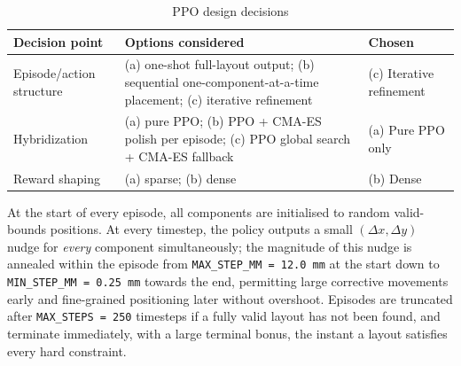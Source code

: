 \documentclass[11pt,a4paper,oneside]{report}
\begin{document}
\begin{table}[H]
\centering
\caption{PPO design decisions}
\label{tab:ppo_design}
\begin{tabular}{|p{3.8cm}|p{5.0cm}|p{3.9cm}|}
\hline
\textbf{Decision point} & \textbf{Options considered} & \textbf{Chosen} \\
\hline
Episode/action structure & (a) one-shot full-layout output; (b) sequential one-component-at-a-time placement; (c) iterative refinement & (c) Iterative refinement \\ \hline
Hybridization & (a) pure PPO; (b) PPO + CMA-ES polish per episode; (c) PPO global search + CMA-ES fallback & (a) Pure PPO only \\ \hline
Reward shaping & (a) sparse; (b) dense & (b) Dense \\
\hline
\end{tabular}
\end{table}

At the start of every episode, all components are initialised to random valid-bounds positions. At every timestep, the policy outputs a small $(\Delta x, \Delta y)$ nudge for \emph{every} component simultaneously; the magnitude of this nudge is annealed within the episode from \texttt{MAX\_STEP\_MM = 12.0~mm} at the start down to \texttt{MIN\_STEP\_MM = 0.25~mm} towards the end, permitting large corrective movements early and fine-grained positioning later without overshoot. Episodes are truncated after \texttt{MAX\_STEPS = 250} timesteps if a fully valid layout has not been found, and terminate immediately, with a large terminal bonus, the instant a layout satisfies every hard constraint.
\end{document}
